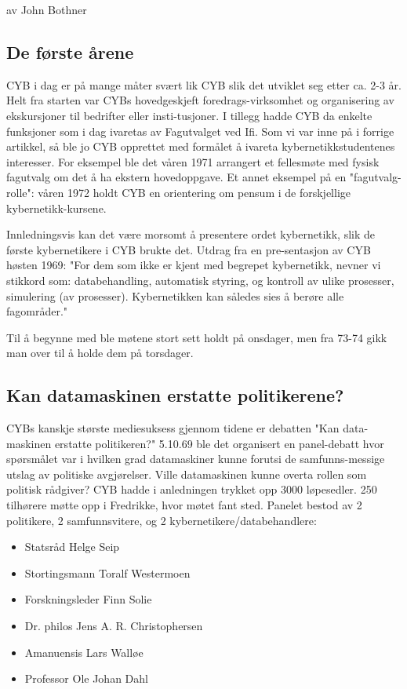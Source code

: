 \documentclass[../main.tex]{subfiles}
\begin{document}
av John Bothner

\subsection{De første årene}
CYB i dag er på mange måter svært lik CYB slik det utviklet seg etter ca. 2-3 år. Helt fra starten var CYBs hovedgeskjeft foredrags-virksomhet og organisering av ekskursjoner til bedrifter eller insti-tusjoner.
I tillegg hadde CYB da enkelte funksjoner som i dag ivaretas av Fagutvalget ved Ifi. Som vi var inne på i forrige artikkel, så ble jo CYB opprettet med formålet å ivareta kybernetikkstudentenes interesser. For eksempel ble det våren 1971 arrangert et fellesmøte med fysisk fagutvalg om det å ha ekstern hovedoppgave. Et annet eksempel på en "fagutvalg-rolle": våren 1972 holdt CYB en orientering om pensum i de forskjellige kybernetikk-kursene.

Innledningsvis kan det være morsomt å presentere ordet kybernetikk, slik de første kybernetikere i CYB brukte det. Utdrag fra en pre-sentasjon av CYB høsten 1969:
"For dem som ikke er kjent med begrepet kybernetikk, nevner vi stikkord som: databehandling, automatisk styring, og kontroll av ulike prosesser, simulering (av prosesser). Kybernetikken kan således sies å berøre alle fagområder."

Til å begynne med ble møtene stort sett holdt på onsdager, men fra 73-74 gikk man over til å holde dem på torsdager.

\subsection{Kan datamaskinen erstatte politikerene?}
CYBs kanskje største mediesuksess gjennom tidene er debatten "Kan data-maskinen erstatte politikeren?" 5.10.69 ble det organisert en panel-debatt hvor spørsmålet var i hvilken grad datamaskiner kunne forutsi de samfunns-messige utslag av politiske avgjørelser. Ville datamaskinen kunne overta rollen som politisk rådgiver? CYB hadde i anledningen trykket opp 3000 løpesedler. 250 tilhørere møtte opp i Fredrikke, hvor møtet fant sted. Panelet bestod av 2 politikere, 2 samfunnsvitere, og 2 kybernetikere/databehandlere:

\begin{itemize}
\item Statsråd Helge Seip
\item Stortingsmann Toralf Westermoen
\item Forskningsleder Finn Solie
\item Dr. philos Jens A. R. Christophersen
\item Amanuensis Lars Walløe
\item Professor Ole Johan Dahl 
\end{itemize}
\end{document}

